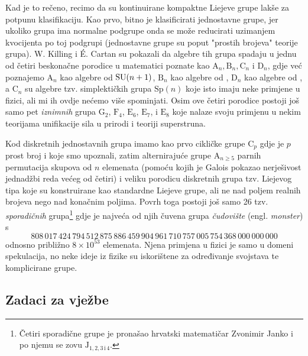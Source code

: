 Kad je to rečeno, recimo da su kontinuirane kompaktne Liejeve grupe
lakše za potpunu klasifikaciju. Kao prvo,
bitno je klasificirati jednostavne grupe, jer ukoliko grupa ima normalne
podgrupe onda se može reducirati uzimanjem kvocijenta po toj podgrupi
(jednostavne grupe su poput "prostih brojeva" teorije grupa). W. Killing i \'{E}. Cartan
  
su pokazali da algebre tih grupa spadaju u jednu od četiri beskonačne 
porodice u matematici poznate kao $\mathrm{A}_n, \mathrm{B}_n, \mathrm{C}_n$
i $\mathrm{D}_n$, gdje već poznajemo
$\mathrm{A}_n$ kao algebre od $\mathrm{SU}(n+1)$,  $\mathrm{B}_n$ kao algebre od ,
$\mathrm{D}_n$ kao algebre od , a $\mathrm{C}_n$ su algebre tzv. simplektičkih grupa
$\mathrm{Sp}(n)$ koje isto imaju neke primjene u fizici, ali mi ih ovdje
nećemo više spominjati. Osim ove četiri porodice postoji još samo
pet \emph{iznimnih} grupa $\mathrm{G}_2$, $\mathrm{F}_4$,
$\mathrm{E}_6$, $\mathrm{E}_7$, i $\mathrm{E}_8$ koje nalaze svoju primjenu
u nekim teorijama unifikacije sila u prirodi i teoriji superstruna.

Kod diskretnih jednostavnih grupa imamo kao prvo cikličke grupe $\mathrm{C}_{p}$
gdje je $p$ prost broj i koje smo upoznali, 
zatim alternirajuće grupe $\mathrm{A}_{n\ge 5}$ parnih permutacija skupova
od $n$ elemenata (pomoću kojih je Galois pokazao nerješivost jednadžbi
reda većeg od četiri) i
veliku porodicu diskretnih grupa tzv. Liejevog tipa koje su konstruirane
kao standardne Liejeve grupe, ali ne nad poljem realnih brojeva nego
nad konačnim poljima. Povrh toga postoji još samo 26 tzv. \emph{sporadičnih}
 
grupa\footnote{Četiri sporadične grupe je pronašao hrvatski matematičar Zvonimir Janko
i po njemu se zovu $\mathrm{J}_{1, 2, 3\,\mathrm{i}\, 4}$.} gdje je najveća od njih
čuvena grupa \emph{čudovište} (engl. \emph{monster}) s
\[ \textstyle
808\,017\,424\,794\,512\,875\,886\,459\,904\,961\,710\,757\,005\,754\,368\,000\,000\,000
\]
odnosno približno $8\times 10^{53}$ elemenata. Njena primjena u fizici je samo u domeni spekulacija, no
neke ideje iz fizike su iskorištene za određivanje svojstava te komplicirane
grupe.




\subsection*{Zadaci za vježbe}

